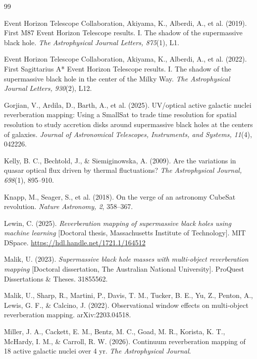 \documentclass[11pt]{article}
\begin{document}
\begin{thebibliography}{99}

Event Horizon Telescope Collaboration, Akiyama, K., Alberdi, A., et al. (2019). First M87 Event Horizon Telescope results. I. The shadow of the supermassive black hole. \textit{The Astrophysical Journal Letters, 875}(1), L1.

Event Horizon Telescope Collaboration, Akiyama, K., Alberdi, A., et al. (2022). First Sagittarius A* Event Horizon Telescope results. I. The shadow of the supermassive black hole in the center of the Milky Way. \textit{The Astrophysical Journal Letters, 930}(2), L12.

Gorjian, V., Ardila, D., Barth, A., et al. (2025). UV/optical active galactic nuclei reverberation mapping: Using a SmallSat to trade time resolution for spatial resolution to study accretion disks around supermassive black holes at the centers of galaxies. \textit{Journal of Astronomical Telescopes, Instruments, and Systems, 11}(4), 042226.

Kelly, B. C., Bechtold, J., \& Siemiginowska, A. (2009). Are the variations in quasar optical flux driven by thermal fluctuations? \textit{The Astrophysical Journal, 698}(1), 895--910.

Knapp, M., Seager, S., et al. (2018). On the verge of an astronomy CubeSat revolution. \textit{Nature Astronomy, 2}, 358--367.

Lewin, C. (2025). \textit{Reverberation mapping of supermassive black holes using machine learning} [Doctoral thesis, Massachusetts Institute of Technology]. MIT DSpace. \url{https://hdl.handle.net/1721.1/164512}

Malik, U. (2023). \textit{Supermassive black hole masses with multi-object reverberation mapping} [Doctoral dissertation, The Australian National University]. ProQuest Dissertations \& Theses. 31855562.

Malik, U., Sharp, R., Martini, P., Davis, T. M., Tucker, B. E., Yu, Z., Penton, A., Lewis, G. F., \& Calcino, J. (2022). Observational window effects on multi-object reverberation mapping. arXiv:2203.04518.

Miller, J. A., Cackett, E. M., Bentz, M. C., Goad, M. R., Korista, K. T., McHardy, I. M., \& Carroll, R. W. (2026). Continuum reverberation mapping of 18 active galactic nuclei over 4 yr. \textit{The Astrophysical Journal}.


\end{thebibliography}
\end{document}
